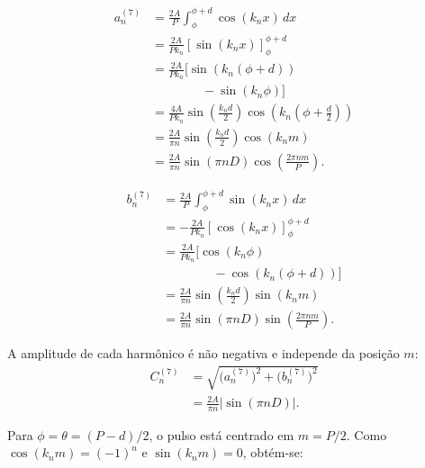 \begin{equation}
    \begin{aligned}
        a_n^{(7)} &= \frac{2A}{P}\int_\phi^{\phi+d}
            \cos(k_nx)\,dx \\
            &= \frac{2A}{Pk_n}\left[\sin(k_nx)\right]_\phi^{\phi+d} \\
            &= \frac{2A}{Pk_n}\bigl[\sin(k_n(\phi+d)) \\
            &\qquad\qquad {}-\sin(k_n\phi)\bigr] \\
            &= \frac{4A}{Pk_n}\sin\left(\frac{k_nd}{2}\right)
                \cos\left(k_n\left(\phi+\frac d2\right)\right) \\
            &= \frac{2A}{\pi n}\sin\left(\frac{k_nd}{2}\right)
                \cos(k_nm) \\
            &= \frac{2A}{\pi n}\sin(\pi nD)
                \cos\left(\frac{2\pi nm}{P}\right).
    \end{aligned}
\end{equation}

\begin{equation}
    \begin{aligned}
        b_n^{(7)} &= \frac{2A}{P}\int_\phi^{\phi+d}
            \sin(k_nx)\,dx \\
            &= -\frac{2A}{Pk_n}\left[\cos(k_nx)\right]_\phi^{\phi+d} \\
            &= \frac{2A}{Pk_n}\bigl[\cos(k_n\phi) \\
            &\qquad\qquad {}-\cos(k_n(\phi+d))\bigr] \\
            &= \frac{2A}{\pi n}\sin\left(\frac{k_nd}{2}\right)
                \sin(k_nm) \\
            &= \frac{2A}{\pi n}\sin(\pi nD)
                \sin\left(\frac{2\pi nm}{P}\right).
    \end{aligned}
\end{equation}

A amplitude de cada harmônico é não negativa e independe da posição $m$:
\begin{equation}
    \begin{aligned}
        C_n^{(7)} &= \sqrt{\bigl(a_n^{(7)}\bigr)^2
            +\bigl(b_n^{(7)}\bigr)^2} \\
            &= \frac{2A}{\pi n}\lvert\sin(\pi nD)\rvert.
    \end{aligned}
\end{equation}

Para $\phi=\theta=(P-d)/2$, o pulso está centrado em $m=P/2$.
Como $\cos(k_nm)=(-1)^n$ e $\sin(k_nm)=0$, obtém-se:

